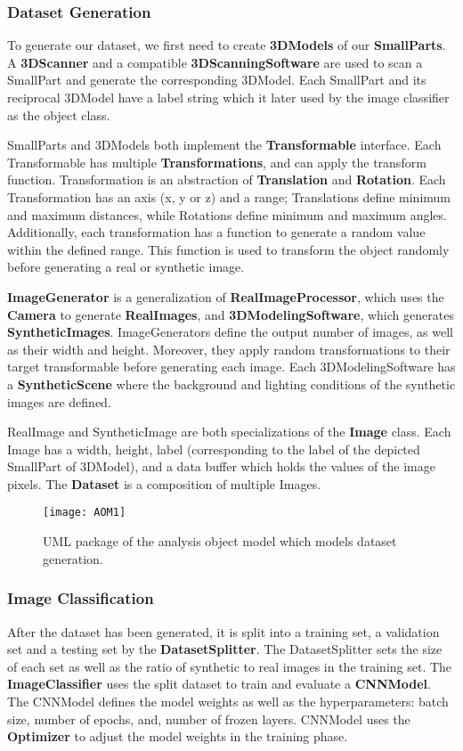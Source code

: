 \subsubsection{Dataset Generation}
To generate our dataset, we first need to create \textbf{3DModels} of our \textbf{SmallParts}. A \textbf{3DScanner} and a compatible \textbf{3DScanningSoftware} are used to scan a SmallPart and generate the corresponding 3DModel. Each SmallPart and its reciprocal 3DModel have a label string which it later used by the image classifier as the object class.

SmallParts and 3DModels both implement the \textbf{Transformable} interface. Each Transformable has multiple \textbf{Transformations}, and can apply the transform function. Transformation is an abstraction of \textbf{Translation} and \textbf{Rotation}. Each Transformation has an axis (x, y or z) and a range; Translations define minimum and maximum distances, while Rotations define minimum and maximum angles. Additionally, each transformation has a function to generate a random value within the defined range. This function is used to transform the object randomly before generating a real or synthetic image.

\textbf{ImageGenerator} is a generalization of \textbf{RealImageProcessor}, which uses the \textbf{Camera} to generate \textbf{RealImages}, and \textbf{3DModelingSoftware}, which generates \textbf{SyntheticImages}. ImageGenerators define the output number of images, as well as their width and height. Moreover, they apply random transformations to their target transformable before generating each image. Each 3DModelingSoftware has a \textbf{SyntheticScene} where the background and lighting conditions of the synthetic images are defined.

RealImage and SyntheticImage are both specializations of the \textbf{Image} class. Each Image has a width, height, label (corresponding to the label of the depicted SmallPart of 3DModel), and a data buffer which holds the values of the image pixels. The \textbf{Dataset} is a composition of multiple Images.

\begin{figure}[H]
\centering
  \texttt{[image: AOM1]}
\caption{UML package of the analysis object model which models dataset generation.}
\label{fig:AOM1}
\end{figure}

\subsubsection{Image Classification}
After the dataset has been generated, it is split into a training set, a validation set and a testing set by the \textbf{DatasetSplitter}. The DatasetSplitter sets the size of each set as well as the ratio of synthetic to real images in the training set. The \textbf{ImageClassifier} uses the split dataset to train and evaluate a \textbf{CNNModel}. The CNNModel defines the model weights as well as the hyperparameters: batch size, number of epochs, and, number of frozen layers. CNNModel uses the \textbf{Optimizer} to adjust the model weights in the training phase.

